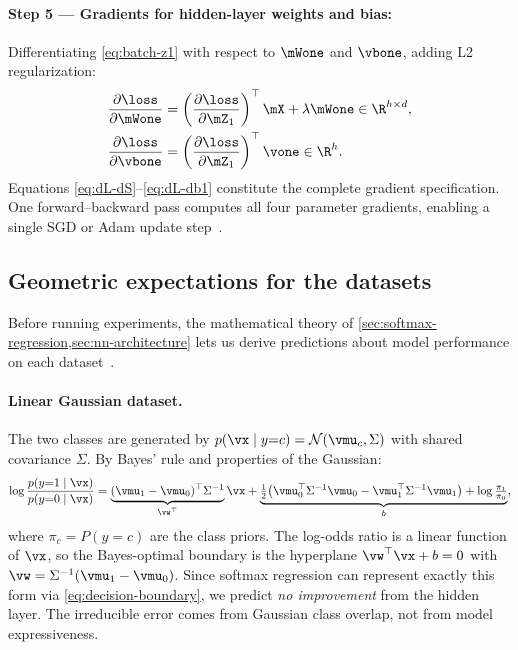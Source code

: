 \documentclass[sigconf,screen,nonacm]{acmart}
\begin{document}
\paragraph{Step 5 --- Gradients for hidden-layer weights and bias:}
Differentiating \cref{eq:batch-z1} with respect to $\mWone$ and $\vbone$, adding L2 regularization:
\begin{align}
    \frac{\partial \loss}{\partial \mWone} &= \left(\frac{\partial \loss}{\partial \mZ_1}\right)^\top \mX + \lambda \mWone \in \R^{h \times d},
    \label{eq:dL-dW1} \\
    \frac{\partial \loss}{\partial \vbone} &= \left(\frac{\partial \loss}{\partial \mZ_1}\right)^\top \vone \in \R^{h}.
    \label{eq:dL-db1}
\end{align}
Equations \eqref{eq:dL-dS}--\eqref{eq:dL-db1} constitute the complete gradient specification. One forward--backward pass computes all four parameter gradients, enabling a single SGD or Adam update step~\cite{cs229dlnotes,goodfellow2016deep}.

\subsection{Geometric expectations for the datasets}
\label{sec:geometric-expectations}

Before running experiments, the mathematical theory of \cref{sec:softmax-regression,sec:nn-architecture} lets us derive predictions about model performance on each dataset~\cite{murphy2022pml,eth_intro_ml}.

\paragraph{Linear Gaussian dataset.}
The two classes are generated by $p(\vx \mid y{=}c) = \mathcal{N}(\vmu_c, \Sigma)$ with shared covariance $\Sigma$. By Bayes' rule and properties of the Gaussian:
\begin{equation}
    \log \frac{p(y{=}1 \mid \vx)}{p(y{=}0 \mid \vx)}
    = \underbrace{(\vmu_1 - \vmu_0)^\top \Sigma^{-1}}_{\vw^\top} \vx
      + \underbrace{\tfrac{1}{2}\bigl(\vmu_0^\top\Sigma^{-1}\vmu_0 - \vmu_1^\top\Sigma^{-1}\vmu_1\bigr) + \log\tfrac{\pi_1}{\pi_0}}_{b},
    \label{eq:gaussian-boundary}
\end{equation}
where $\pi_c = P(y{=}c)$ are the class priors. The log-odds ratio is a linear function of $\vx$, so the Bayes-optimal boundary is the hyperplane $\vw^\top\vx + b = 0$ with $\vw = \Sigma^{-1}(\vmu_1 - \vmu_0)$. Since softmax regression can represent exactly this form via \cref{eq:decision-boundary}, we predict \emph{no improvement} from the hidden layer. The irreducible error comes from Gaussian class overlap, not from model expressiveness.
\end{document}
